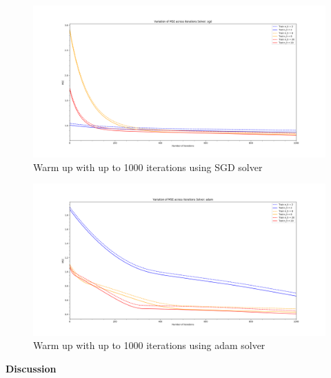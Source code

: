 \documentclass[12pt,a4paper]{article}
\begin{document}
\begin{enumerate}[a)]
\begin{figure}[H]
	\centering
  \includegraphics[width=\textwidth]{figures/1_1_d_sgd.png}
	\caption{Warm up with up to 1000 iterations using SGD solver}
	\label{1_1_d_sgd}
\end{figure}

\begin{figure}[H]
	\centering
  \includegraphics[width=\textwidth]{figures/1_1_d_adam.png}
	\caption{Warm up with up to 1000 iterations using adam solver}
	\label{1_1_d_adam}
\end{figure}

\textbf{Discussion}


\end{enumerate}
\end{document}
